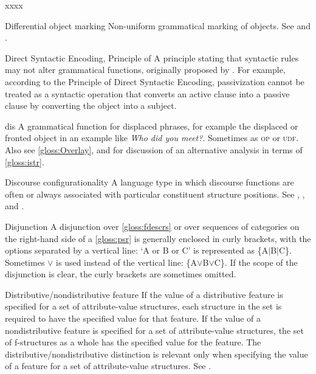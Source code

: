 \documentclass[output=paper,colorlinks,citecolor=brown]{langscibook}
\begin{document}
\begin{labeling}{xxxx}
\item[Differential object marking] Non-uniform grammatical marking of objects. See \citet{chapters/InformationStructure} and \citet{chapters/FinnoUgric}.

\item[Direct Syntactic Encoding, Principle of] A principle stating that syntactic rules may not alter grammatical functions, originally proposed by \citet{kaplanbresnan82}.  For example, according to the Principle of Direct Syntactic Encoding, passivization cannot be treated as a syntactic operation that converts an active clause into a passive clause by converting the object into a subject.

\item[dis\namedlabel{gloss:dis}{\textsc{dis}}] A grammatical function for displaced phrases, for example the displaced or fronted object in an example like \emph{Who did you meet?}.  Sometimes as \textsc{op} or \textsc{udf}.  Also see \ref{gloss:Overlay}, and  for discussion of an alternative analysis in terms of \ref{gloss:istr}.

\item[Discourse configurationality] A language type in which discourse functions are often or always associated with particular constituent structure positions. See \citet{chapters/InformationStructure}, \citet{chapters/Historical}, and \citet{chapters/FinnoUgric}.

\item[Disjunction\namedlabel{gloss:Disjunction}{Disjunction}\namedlabel{gloss:disjunction}{disjunction}] A disjunction over \ref{gloss:fdescrs} or over sequences of categories on the right-hand side of a \ref{gloss:psr} is generally enclosed in curly brackets, with the options separated by a vertical line: `A or B or C' is represented as \{A$\mid$B$\mid$C\}.  Sometimes $\vee$ is used instead of the vertical line: \{A$\vee$B$\vee$C\}.  If the scope of the disjunction is clear, the curly brackets are sometimes omitted.

\item[Distributive/nondistributive feature\namedlabel{gloss:DistFeature}{Distributive/nondistributive feature}] If the value of a distributive feature is specified for a set of attribute-value structures, each structure in the set is required to have the specified value for that feature.  If the value of a nondistributive feature is specified for a set of attribute-value structures, the set of f-structures as a whole has the specified value for the feature.  The distributive/nondistributive distinction is relevant only when specifying the value of a feature for a set of attribute-value structures.  See .


\end{labeling}
\end{document}
